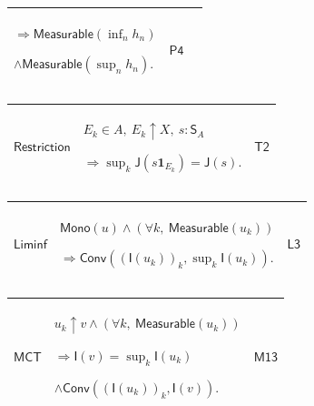 \documentclass[11pt]{amsart}
\newlength{\FTCThreeColumnBody}
\begin{document}
{\begin{tabular}{|@{}>{\centering\arraybackslash}m{0.251968\FTCThreeColumnBody}|>{\centering\arraybackslash}m{0.590551\FTCThreeColumnBody}|>{\centering\arraybackslash}m{0.157480\FTCThreeColumnBody}|}
$\displaystyle \Rightarrow\textsf{Measurable}(\inf_n h_n)$\par
$\displaystyle \land\textsf{Measurable}(\sup_n h_n).$ & \hyperlink{proof:P4}{$\displaystyle \textsf{P4}$}\\ \hline
\end{tabular}%
\par\setlength{\parskip}{0pt}\nointerlineskip
\noindent
\begin{tabular}{|@{}>{\centering\arraybackslash}m{0.251968\FTCThreeColumnBody}|>{\centering\arraybackslash}m{0.590551\FTCThreeColumnBody}|>{\centering\arraybackslash}m{0.157480\FTCThreeColumnBody}|}\hline
\hypertarget{lem:Restriction}{$\displaystyle \textsf{Restriction}$} & $\displaystyle E_k\in A,\ E_k\uparrow X,\ s:\textsf{S}_A$\par
$\displaystyle \Rightarrow\sup_k\textsf{J}(s\mathbf1_{E_k})=\textsf{J}(s).$ & \hyperlink{proof:T2}{$\displaystyle \textsf{T2}$}\\ \hline
\end{tabular}%
\par\setlength{\parskip}{0pt}\nointerlineskip
\noindent
\begin{tabular}{|@{}>{\centering\arraybackslash}m{0.251968\FTCThreeColumnBody}|>{\centering\arraybackslash}m{0.590551\FTCThreeColumnBody}|>{\centering\arraybackslash}m{0.157480\FTCThreeColumnBody}|}\hline
\hypertarget{lem:Liminf}{$\displaystyle \textsf{Liminf}$} & $\displaystyle \textsf{Mono}(u)\land(\forall k,\ \textsf{Measurable}(u_k))$\par
$\displaystyle \Rightarrow\textsf{Conv}((\textsf{I}(u_k))_k,\sup_k\textsf{I}(u_k)).$ & \hyperlink{proof:L3}{$\displaystyle \textsf{L3}$}\\ \hline
\end{tabular}%
\par\setlength{\parskip}{0pt}\nointerlineskip
\noindent
\begin{tabular}{|@{}>{\centering\arraybackslash}m{0.251968\FTCThreeColumnBody}|>{\centering\arraybackslash}m{0.590551\FTCThreeColumnBody}|>{\centering\arraybackslash}m{0.157480\FTCThreeColumnBody}|}\hline
\hypertarget{lem:MCT}{$\displaystyle \textsf{MCT}$} & $\displaystyle u_k\uparrow v\land(\forall k,\ \textsf{Measurable}(u_k))$\par
$\displaystyle \Rightarrow\textsf{I}(v)=\sup_k\textsf{I}(u_k)$\par
$\displaystyle \land\textsf{Conv}((\textsf{I}(u_k))_k,\textsf{I}(v)).$ & \hyperlink{proof:M13}{$\displaystyle \textsf{M13}$}\\ \hline
\end{tabular}%
\par
}
\end{document}
